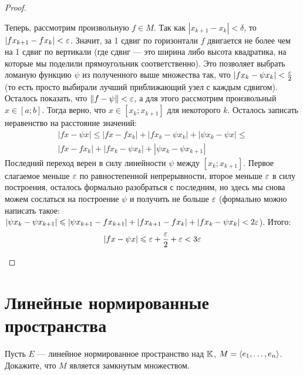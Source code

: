 \begin{proof}
\begin{itemize}
		Теперь, рассмотрим произвольную $f \in M$. Так как $|x_{k + 1} - x_k| < \delta$, то $|fx_{k + 1} - fx_k| < \varepsilon$. Значит, за 1 сдвиг по горизонтали $f$ двигается не более чем на 1 сдвиг по вертикали (где сдвиг --- это ширина либо высота квадратика, на которые мы поделили прямоугольник соответственно). Это позволяет выбрать ломаную функцию $\psi$ из полученного выше множества так, что $|fx_k - \psi x_k| < \frac{\varepsilon}{2}$ (то есть просто выбирали лучший приближающий узел с каждым сдвигом). Осталось показать, что $\|f - \psi\| < \varepsilon$, а для этого рассмотрим произвольный $x \in [a; b]$. Тогда верно, что $x \in [x_k; x_{k + 1}]$ для некоторого $k$. Осталось записать неравенство на расстояние значений:
		\begin{multline*}
			|fx - \psi x| \le |fx - fx_k| + |fx_k - \psi x_k| + |\psi x_k - \psi x| \le
			\\
			|fx - fx_k| + |fx_k - \psi x_k| + |\psi x_k - \psi x_{k + 1}|
		\end{multline*}
		Последний переход верен в силу линейности $\psi$ между $[x_k; x_{k + 1}]$. Первое слагаемое меньше $\varepsilon$ по равностепенной непрерывности, второе меньше $\varepsilon$ в силу построения, осталось формально разобраться с последним, но здесь мы снова можем сослаться на построение $\psi$ и получить не больше $\varepsilon$ (формально можно написать такое: $|\psi x_k - \psi x_{k + 1}| \leqslant |\psi x_{k + 1} - fx_{k + 1}| + |fx_{k + 1} - fx_k| + |fx_k - \psi x_k| < 2\varepsilon$). Итого:
		\[
			|fx - \psi x| \leqslant \varepsilon + \frac{\varepsilon}{2} + \varepsilon < 3\varepsilon
		\]
	\end{itemize}
\end{proof}

\section{Линейные нормированные пространства}

\begin{exercise}
	Пусть $E$ --- линейное нормированное пространство над $\mathbb{K}$, $M = \left\langle e_1, \ldots, e_n\right\rangle$. Докажите, что $M$ является замкнутым множеством.
\end{exercise}